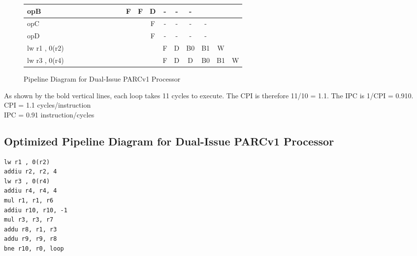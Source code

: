 \documentclass[10pt]{article}
\begin{document}
\begin{figure}[H]
{\begin{tabular}{|l|c|c|c|c!{\vrule width 1.5pt}c|c|c|c|c|c|c|c|c|c|c!{\vrule width 1.5pt}c|c|}
opB               &    &    &    &    &    &    &    &    & F  & F  & D  & -  & -  & -  &    &    &    \\ \hline
opC               &    &    &    &    &    &    &    &    &    &    & F  & -  & -  & -  & -  &    &    \\ \hline
opD               &    &    &    &    &    &    &    &    &    &    & F  & -  & -  & -  & -  &    &    \\ \hline
lw r1 , 0(r2)     &    &    &    &    &    &    &    &    &    &    &    & F  & D  & B0 & B1 & W  &    \\ \hline
lw r3 , 0(r4)     &    &    &    &    &    &    &    &    &    &    &    & F  & D  & D  & B0 & B1 & W  \\ \hline
\end{tabular}
}
\caption{Pipeline Diagram for Dual-Issue PARCv1 Processor}
\end{figure}
As shown by the bold vertical lines, each loop takes 11 cycles to execute. The CPI is therefore 11/10 = 1.1. The IPC is 1/CPI = 0.910.\\
CPI = 1.1 cycles/instruction\\
IPC = 0.91 instruction/cycles\\

\subsection{Optimized Pipeline Diagram for Dual-Issue PARCv1 Processor}

\begin{lstlisting}
lw r1 , 0(r2)     
addiu r2, r2, 4   
lw r3 , 0(r4)     
addiu r4, r4, 4   
mul r1, r1, r6    
addiu r10, r10, -1
mul r3, r3, r7    
addu r8, r1, r3   
addu r9, r9, r8   
bne r10, r0, loop                
\end{lstlisting}
\end{document}
